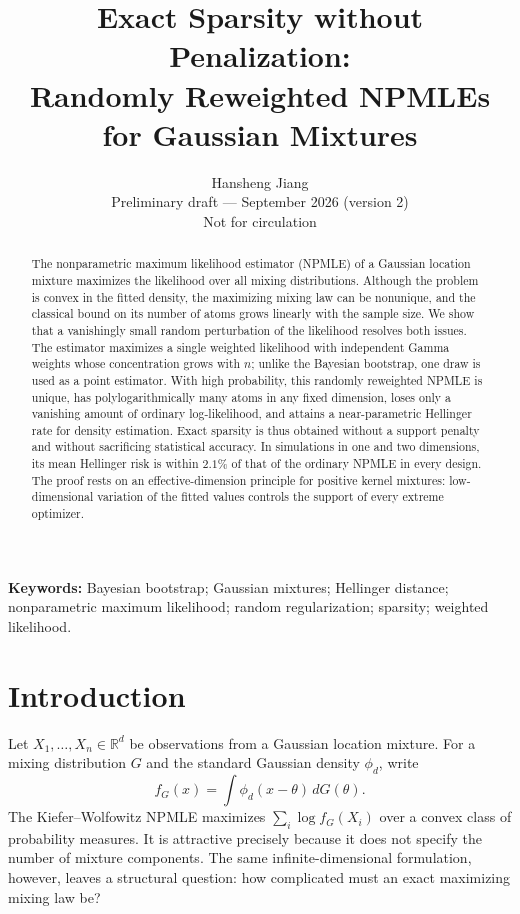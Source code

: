 \documentclass[11pt]{article}
\title{\bfseries Exact Sparsity without Penalization:\\
Randomly Reweighted NPMLEs for Gaussian Mixtures}
\author{Hansheng Jiang\\
\small Preliminary draft --- September 2026 (version 2)\\
\small Not for circulation}
\date{}
\theoremstyle{definition}
\theoremstyle{remark}
\newcommand{\RR}{\mathbb R}
\begin{document}
\maketitle

\begin{abstract}
The nonparametric maximum likelihood estimator (NPMLE) of a Gaussian
location mixture maximizes the likelihood over all mixing distributions.
Although the problem is convex in the fitted density, the maximizing mixing
law can be nonunique, and the classical bound on its number of atoms grows
linearly with the sample size.  We show that a vanishingly small random
perturbation of the likelihood resolves both issues.  The estimator
maximizes a single weighted likelihood with independent Gamma weights whose
concentration grows with $n$; unlike the Bayesian bootstrap, one draw is used
as a point estimator.  With high probability, this randomly reweighted NPMLE
is unique, has polylogarithmically many atoms in any fixed dimension, loses
only a vanishing amount of ordinary log-likelihood, and attains a
near-parametric Hellinger rate for density estimation.  Exact sparsity is
thus obtained without a support penalty and without sacrificing statistical
accuracy.  In simulations in one and two dimensions, its mean Hellinger risk
is within $2.1\%$ of that of the ordinary NPMLE in every design.  The proof
rests on an effective-dimension principle for positive kernel mixtures:
low-dimensional variation of the fitted values controls the support of every
extreme optimizer.
\end{abstract}

\noindent\textbf{Keywords:} Bayesian bootstrap; Gaussian mixtures; Hellinger
distance; nonparametric maximum likelihood; random regularization; sparsity;
weighted likelihood.

\section{Introduction}\label{sec:introduction}

Let $X_1,\ldots,X_n\in\RR^d$ be observations from a Gaussian location
mixture.  For a mixing distribution $G$ and the standard Gaussian density
$\phi_d$, write
\[
  f_G(x)=\int \phi_d(x-\theta)\,dG(\theta).
\]
The Kiefer--Wolfowitz NPMLE \citep{kieferwolfowitz1956} maximizes
$\sum_i\log f_G(X_i)$ over a convex class of probability measures.  It is attractive precisely because it does
not specify the number of mixture components.  The same infinite-dimensional
formulation, however, leaves a structural question: how complicated must an
exact maximizing mixing law be?
\end{document}
